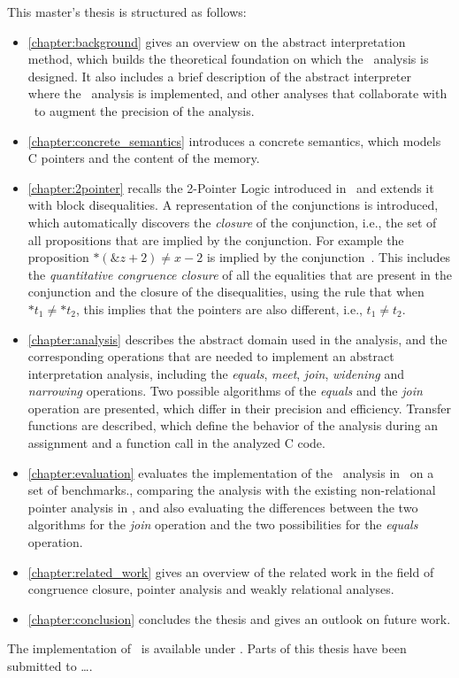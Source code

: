 This master's thesis is structured as follows:
\begin{itemize}
    \item \cref{chapter:background} gives an overview on the abstract interpretation method, which builds the theoretical foundation on which the \cpo\ analysis is designed.
    It also includes a brief description of the abstract interpreter \goblint\, where the \cpo\ analysis is implemented, and other analyses that collaborate with \cpo\ to augment the precision of the analysis.
    \item \cref{chapter:concrete_semantics} introduces a concrete semantics, which models C pointers and the content of the memory.
    \item \cref{chapter:2pointer} recalls the 2-Pointer Logic introduced in~\cite{2pointer} and extends it with block disequalities.
    A representation of the conjunctions is introduced, which automatically discovers the \emph{closure} of the conjunction,
    i.e., the set of all propositions that are implied by the conjunction.
    For example the proposition $*(\&z + 2) \neq x - 2$ is implied by the conjunction~.
    This includes the \emph{quantitative congruence closure} of all the equalities that are present in the conjunction and
    the closure of the disequalities, using the rule that when $*t_1 \neq *t_2$, this implies that the pointers are also different, i.e., $t_1 \neq t_2$.
    \item \cref{chapter:analysis} describes the abstract domain used in the analysis, and the corresponding operations that are needed to implement an abstract interpretation analysis, including the \emph{equals}, \emph{meet}, \emph{join}, \emph{widening} and \emph{narrowing} operations.
    Two possible algorithms of the \emph{equals} and the \emph{join} operation are presented, which differ in
    their precision and efficiency.
    Transfer functions are described, which define the behavior of the analysis during an assignment and a function call in the analyzed C code.
    \item \cref{chapter:evaluation} evaluates the implementation of the \cpo\ analysis in \goblint\ on a set of benchmarks.,
    comparing the analysis with the existing non-relational pointer analysis in \goblint, and also
    evaluating the differences between the two algorithms for the \emph{join} operation and the two possibilities for the \emph{equals} operation.
    \item \cref{chapter:related_work} gives an overview of the related work in the field of congruence closure, pointer analysis and weakly relational analyses.
    \item \cref{chapter:conclusion} concludes the thesis and gives an outlook on future work.
\end{itemize}

The implementation of \cpo\ is available under . Parts of this thesis have been submitted to \dots.
